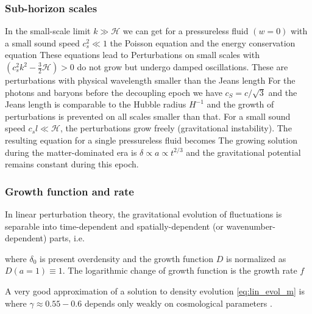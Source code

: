 \subsubsection{Sub-horizon scales}
In the small-scale limit $k\gg\mathcal{H}$ we can get for a pressureless fluid $(w=0)$ with a small sound speed $c_s^2\ll1$ the Poisson equation
and the energy conservation equation
These equations lead to
Perturbations on small scales with $(c_s^2k^2-\frac32\mathcal{H})>0$ do not grow but undergo damped oscillations. These are perturbations with physical wavelength smaller than the Jeans length
For the photons and baryons before the decoupling epoch we have $c_S=c/\sqrt3$ and the Jeans length is comparable to the Hubble radius $H^{-1}$ and the growth of perturbations is prevented on all scales smaller than that. For a small sound speed $c_sl\ll\mathcal{H}$, the perturbations grow freely (gravitational instability). The resulting equation for a single pressureless fluid becomes
The growing solution during the matter-dominated era is $\delta\propto a\propto t^{2/3}$ and the gravitational potential remains constant during this epoch.

\subsubsection{Growth function and rate}
In linear perturbation theory, the gravitational evolution of fluctuations is separable into time-dependent and spatially-dependent (or wavenumber-dependent) parts, i.e.
\begin{sloppypar}
where $\delta_0$ is present overdensity and the growth function $D$ is normalized as ${D(a=1)\equiv1}$. The logarithmic change of growth function is the growth rate $f$
\end{sloppypar}
 A very good approximation of a solution to density evolution \eqref{eq:lin_evol_m} is
where $\gamma\approx0.55-0.6$ depends only weakly on cosmological parameters \parencite{1980_Peebles}.

